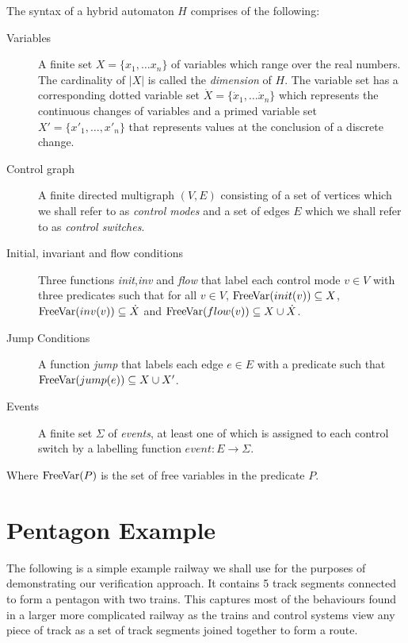 \medskip
\begin{mydef}
The syntax of a hybrid automaton $H$ comprises of the following:
\begin{description}
\item[Variables] A finite set $X = \{x_1, \ldots x_n \}$ of variables which range over the real numbers. The cardinality of $|X|$ is called the \emph{dimension} of $H$. The variable set has a corresponding dotted variable set $\dot{X} = \{\dot{x}_1, \ldots \dot{x}_n \}$ which represents the continuous changes of variables and a primed variable set $X' = \{x'_1, \ldots , x'_n \}$ that represents  values at the conclusion of a discrete change.

\item[Control graph] A finite directed multigraph $(V,E)$ consisting of a set of vertices which we shall refer to as \emph{control modes} and a set of edges $E$ which we shall refer to as \emph{control switches}.

\item[Initial, invariant and flow conditions] Three functions \emph{init},\emph{inv} and \emph{flow} that label each control mode $v \in V$ with three predicates such that for all $v \in V$, $\mathrm{FreeVar}(init(v)) \subseteq X$, $\mathrm{FreeVar}(inv(v)) \subseteq \dot{X}$ and $\mathrm{FreeVar}(flow(v)) \subseteq X \cup \dot{X}$. 


\item[Jump Conditions] A function \emph{jump} that labels each edge $e \in E$ with a predicate such that $\mathrm{FreeVar}(jump(e)) \subseteq X \cup X' $.

\item[Events] A finite set $\Sigma$ of \emph{events}, at least one of which is assigned to  each control switch by a labelling function $event: E \to \Sigma$.

\end{description}
Where $\mathrm{FreeVar}(P)$ is the set of free variables in the predicate $P$.
\end{mydef}
\medskip


\medskip
\section{Pentagon Example}

\medskip
The following is a simple example railway we shall use for the purposes of demonstrating our verification approach.  It contains 5 track segments connected to form a pentagon with two trains. This captures most of the behaviours found in a larger more complicated railway as the trains and control systems view any piece of track as a set of track segments joined together to form a route.

